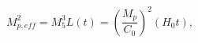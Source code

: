 \begin{equation}
M_{p,eff}^2=M_5^3 L(t) = \left( \frac{M_p}{C_0} \right)^2 (H_0 t), 
\end{equation}

